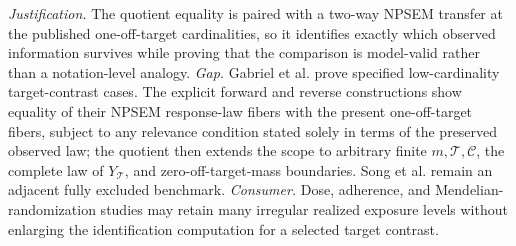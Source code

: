\documentclass{article}
\begin{document}
\par\smallskip\noindent \textit{Justification.} The quotient equality is paired with a two-way NPSEM transfer at the published one-off-target cardinalities, so it identifies exactly which observed information survives while proving that the comparison is model-valid rather than a notation-level analogy. \textit{Gap.} Gabriel et al. prove specified low-cardinality target-contrast cases.  The explicit forward and reverse constructions show equality of their NPSEM response-law fibers with the present one-off-target fibers, subject to any relevance condition stated solely in terms of the preserved observed law; the quotient then extends the scope to arbitrary finite \(m,\mathcal T,\mathcal C\), the complete law of \(Y_{\mathcal T}\), and zero-off-target-mass boundaries.  Song et al. remain an adjacent fully excluded benchmark. \textit{Consumer.} Dose, adherence, and Mendelian-randomization studies may retain many irregular realized exposure levels without enlarging the identification computation for a selected target contrast.
\end{document}
